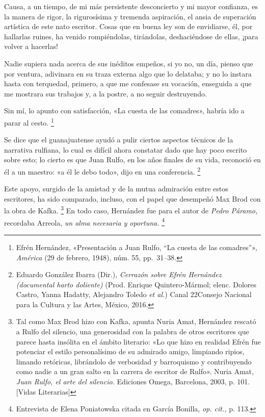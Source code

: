 \documentclass[14pt,twoside,final]{extbook} %
\let\oldfootnote\footnote
\renewcommand\footnote[1]{%
\oldfootnote{\hspace{1mm}#1}}
\begin{document}
\begin{quoting}
Causa, a un tiempo, de mi más persistente desconcierto y mi mayor confianza, es la manera de rigor, la rigurosísima y tremenda aspiración, el ansia de superación artística de este nato escritor. Cosas que en buena ley son de envidiarse, él, por hallarlas ruines, ha venido rompiéndolas, tirándolas, deshaciéndose de ellas, ¡para volver a hacerlas!

Nadie supiera nada acerca de sus inéditos empeños, si yo no, un día, pienso que por ventura, adivinara en su traza externa algo que lo delataba; y no lo instara hasta con terquedad, primero, a que me confesase su vocación, enseguida a que me mostrara sus trabajos y, a la postre, a no seguir destruyendo.

Sin mí, lo apunto con satisfacción, «La cuesta de las comadres», habría ido a parar al cesto.\footnote{Efrén Hernández, «Presentación a Juan Rulfo, ``La cuesta de las comadres''», \emph{América} (29 de febrero, 1948), núm. 55, \mbox{pp. 31--38.}}
\end{quoting}
Se dice que el guanajuatense ayudó a pulir ciertos aspectos técnicos de la narrativa rulfiana, lo cual es difícil ahora constatar dado que hay poco escrito sobre esto; lo cierto es que Juan Rulfo, en los años finales de su vida, reconoció en él a un maestro: «a él le debo todo», dijo en una conferencia.\footnote{Eduardo González Ibarra (Dir.), \emph{Cerrazón sobre Efrén Hernández (documental harto doliente)} (Prod. Enrique Quintero-Mármol; elenc. Dolores Castro, Yanna Hadatty, Alejandro Toledo \emph{et al.}) Canal 22\kernedslash Consejo Nacional para la Cultura y las Artes, México, 2016.}

Este apoyo, surgido de la amistad y de la mutua admiración entre estos escritores, ha sido comparado, incluso, con el papel que desempeñó Max Brod con la obra de Kafka.\footnote{Tal como Max Brod hizo con Kafka, apunta Nuria Amat, Hernández rescató a Rulfo del silencio, una generosidad con la palabra de otros escritores que parece hasta insólita en el ámbito literario: «Lo que hizo en realidad Efrén fue potenciar el estilo personalísimo de su admirado amigo, limpiando ripios, limando retóricas, librándolo de verbosidad y barroquismo y contribuyendo como nadie a un gran salto en la carrera de escritor de Rulfo». Nuria Amat, \emph{Juan Rulfo, el arte del silencio.} Ediciones Omega, Barcelona, 2003, p. 101. [Vidas Literarias]} En todo caso, Hernández fue para el autor de \emph{Pedro Páramo,} recordaba Arreola, \emph{un alma necesaria y oportuna.}\footnote{Entrevista de Elena Poniatowska citada en García Bonilla, \emph{op. cit.,} p. 113.}
\end{document}
